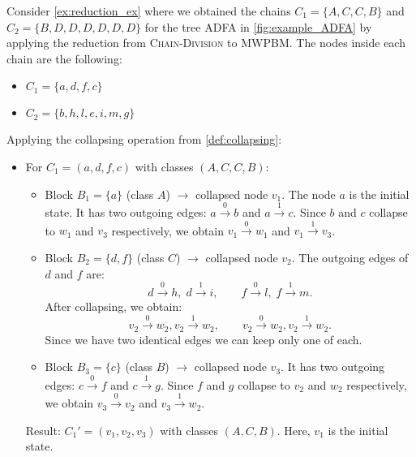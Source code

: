 \begin{example}
    Consider \cref{ex:reduction_ex} where we obtained the chains $C_1 = \{A,C,C,B\}$ and $C_2 = \{B,D,D,D,D,D,D\}$ for the tree ADFA in \cref{fig:example_ADFA} by applying the reduction from \textsc{Chain-Division} to \textsc{MWPBM}. The nodes inside each chain are the following:
    \begin{itemize}
        \item $C_1 = \{a,d,f,c\}$
        \item $C_2 = \{b,h,l,e,i,m,g\}$
    \end{itemize}
    
    Applying the collapsing operation from \cref{def:collapsing}:
    \begin{itemize}
        \item For $C_1 = (a,d,f,c)$ with classes $(A,C,C,B)$: 
        \begin{itemize}
            \item Block $B_1 = \{a\}$ (class $A$) $\rightarrow$ collapsed node $v_1$. The node $a$ is the initial state. It has two outgoing edges: $a \xrightarrow{0} b$ and $a \xrightarrow{1} c$. Since $b$ and $c$ collapse to $w_1$ and $v_3$ respectively, we obtain $v_1 \xrightarrow{0} w_1$ and $v_1 \xrightarrow{1} v_3$.
            \item Block $B_2 = \{d,f\}$ (class $C$) $\rightarrow$ collapsed node $v_2$. The outgoing edges of $d$ and $f$ are:
            \[
                d \xrightarrow{0} h,\; d \xrightarrow{1} i,\qquad
                f \xrightarrow{0} l,\; f \xrightarrow{1} m.
            \]
            After collapsing, we obtain:
            \[
                v_2 \xrightarrow{0} w_2, v_2 \xrightarrow{1} w_2,\qquad v_2 \xrightarrow{0} w_2, v_2 \xrightarrow{1} w_2.
            \]
            Since we have two identical edges we can keep only one of each.
            \item Block $B_3 = \{c\}$ (class $B$) $\rightarrow$ collapsed node $v_3$. It has two outgoing edges: $c \xrightarrow{0} f$ and $c \xrightarrow{1} g$. Since $f$ and $g$ collapse to $v_2$ and $w_2$ respectively, we obtain $v_3 \xrightarrow{0} v_2$ and $v_3 \xrightarrow{1} w_2$.
        \end{itemize}
        Result: $C_1' = (v_1, v_2, v_3)$ with classes $(A, C, B)$. Here, $v_1$ is the initial state.
        

\end{itemize}
\end{example}
